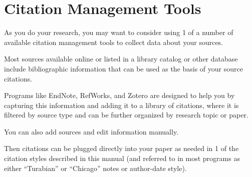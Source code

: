 \documentclass[oneside]{book}
\numberwithin{equation}{section}
\begin{document}
\section{Citation Management Tools}
As you do your research, you may want to consider using 1 of a number of available citation management tools to collect data about your sources.

Most sources available online or listed in a library catalog or other database include bibliographic information that can be used as the basis of your source citations.

Programs like EndNote, RefWorks, and Zotero are designed to help you by capturing this information and adding it to a library of citations, where it is filtered by source type and can be further organized by research topic or paper.

You can also add sources and edit information manually.

Then citations can be plugged directly into your paper as needed in 1 of the citation styles described in this manual (and referred to in most programs as either ``Turabian'' or ``Chicago'' notes or author-date style).
\end{document}
